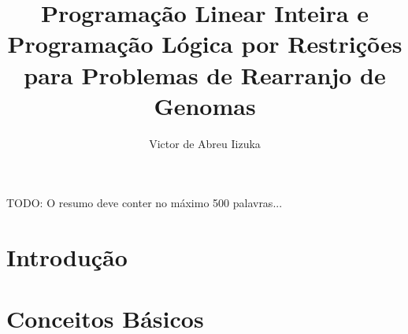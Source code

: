 \documentclass[12pt,twoside]{report} %
\begin{document}
  
\title{Programação Linear Inteira e Programação Lógica por Restrições
  para Problemas de Rearranjo de Genomas}

\author{Victor de Abreu Iizuka}







\copyrightfalse %
%
\finalversionfalse %
%
\tablespagetrue %
%
\figurespagetrue %
%

\beforepreface



TODO: O resumo deve conter no m{\'a}ximo 500 palavras...
% 




\afterpreface %
%

\chapter{Introdução}
\label{cap:intro}


\chapter{Conceitos Básicos}
\label{cap:basic}

\end{document}
